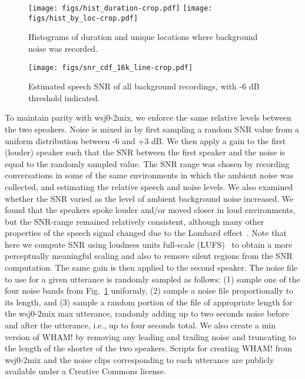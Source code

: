 \documentclass[a4paper]{article}
\begin{document}
\begin{figure}[tb]
	\centering
		\texttt{[image: figs/hist\_duration-crop.pdf]}
		\texttt{[image: figs/hist\_by\_loc-crop.pdf]}\vspace{-.15cm}
	\caption{Histograms of duration and unique locations where background noise was recorded.}
	\label{fig:dataset_hists}\vspace{-.1cm}
\end{figure}
\begin{figure}[tb]
	\centering
		\texttt{[image: figs/snr\_cdf\_16k\_line-crop.pdf]}
		\vspace{-.25cm}
	\caption{Estimated speech SNR of all background recordings, with -6 dB threshold indicated.}
	\label{fig:est_snr_cdf}\vspace{-.7cm}
\end{figure}

To maintain parity with wsj0-2mix, we enforce the same relative levels between the two speakers.  Noise is mixed in by first sampling a random SNR value from a uniform distribution between -6 and +3 dB.  We then apply a gain to the first (louder) speaker such that the SNR between the first speaker and the noise is equal to the randomly sampled value.  The SNR range was chosen by recording conversations in some of the same environments in which the ambient noise was collected, and estimating the relative speech and noise levels.  We also examined whether the SNR varied as the level of ambient background noise increased.  We found that the speakers spoke louder and/or moved closer in loud environments, but the SNR-range remained relatively consistent, although many other properties of the speech signal changed due to the Lombard effect~\cite{lu2008speech}.  Note that here we compute SNR using loudness units full-scale (LUFS)~\cite{grimm2010toward} to obtain a more perceptually meaningful scaling and also to remove silent regions from the SNR computation.  The same gain is then applied to the second speaker.  The noise file to use for a given utterance is randomly sampled as follows: (1) sample one of the four noise bands from Fig.~\ref{fig:dataset_hists} uniformly, (2) sample a noise file proportionally to its length, and (3) sample a random portion of the file of appropriate length for the wsj0-2mix max utterance, randomly adding up to two seconds noise before and after the utterance, i.e., up to four seconds total.  We also create a min version of WHAM! by removing any leading and trailing noise and truncating to the length of the shorter of the two speakers.  Scripts for creating WHAM! from wsj0-2mix and the noise clips corresponding to each utterance are publicly available under a Creative Commons license. 
\end{document}
